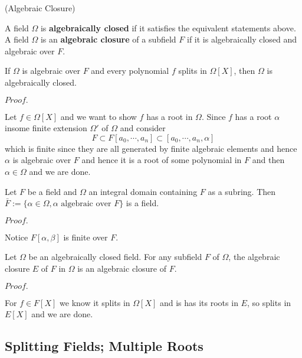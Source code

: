 \documentclass{article}
\newcommand{\Pf}[1]{$Proof.$\par}
\begin{document}
\begin{definition}
    (Algebraic Closure)\par
    A field $\Omega$ is \textbf{algebraically closed} if it satisfies the equivalent statements above. A field $\Omega$ is an \textbf{algebraic closure} of a subfield $F$ if it is algebraically closed and algebraic over $F$.
\end{definition}

\begin{proposition}
    If $\Omega$ is algebraic over $F$ and every polynomial $f$ splits in $\Omega[X]$, then $\Omega$ is algebraically closed.
\end{proposition}
\Pf\par
    Let $f\in \Omega[X]$ and we want to show $f$ has a root in $\Omega$. Since $f$ has a root $\alpha$ insome finite extension $\Omega'$ of $\Omega$ and consider
    \[F\subset F[a_0,\cdots,a_n]\subset[a_0,\cdots,a_n,\alpha]\]
    which is finite since they are all generated by finite algebraic elements and hence $\alpha$ is algebraic over $F$ and hence it is a root of some polynomial in $F$ and then $\alpha \in \Omega$ and we are done.

\begin{proposition}
    Let $F$ be a field and $\Omega$ an integral domain containing $F$ as a subring. Then $\bar{F}:= \{\alpha \in \Omega, \alpha\text{ algebraic over }F\}$ is a field.
\end{proposition}
\Pf\par
    Notice $F[\alpha,\beta]$ is finite over $F$.

\begin{corollary}
    Let $\Omega$ be an algebraically closed field. For any subfield $F$ of $\Omega$, the algebraic closure $E$ of $F$ in $\Omega$ is an algebraic closure of $F$.
\end{corollary}
\Pf\par
    For $f\in F[X]$ we know it splits in $\Omega[X]$ and is has its roots in $E$, so splits in $E[X]$ and we are done.

\subsection{Splitting Fields; Multiple Roots}
\end{document}
